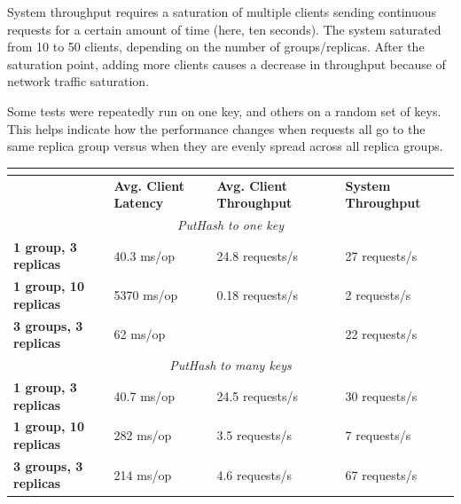 \documentclass[letterpaper,10pt]{article}
\begin{document}
System throughput requires a saturation of multiple clients sending continuous requests for a certain amount of time (here, ten seconds). The system saturated from 10 to 50 clients, depending on the number of groups/replicas. After the saturation point, adding more clients
causes a decrease in throughput because of network traffic saturation.

Some tests were repeatedly run on one key, and others on a random set of keys. This helps indicate how the performance changes when requests all go to the same replica group versus when they are evenly spread across all replica groups.

\begin{table}
\begin{tabular}{|l|l|l|l|}
\hline
\multicolumn{4}{|c|}{\cellcolor[HTML]{C0C0C0}{\color[HTML]{000000} \textbf{Vanilla Paxos}}}                           \\ \hline
                              & \textbf{Avg. Client Latency} & \textbf{Avg. Client Throughput} & \textbf{System Throughput} \\ \hline
\multicolumn{4}{|c|}{\textit{PutHash to one key}}                                                                     \\ \hline
\textbf{1 group, 3 replicas}  & 40.3 ms/op                   & 24.8 requests/s              & 27 requests/s           \\ \hline
\textbf{1 group, 10 replicas} & 5370 ms/op                   & 0.18 requests/s              & 2 requests/s            \\ \hline
\textbf{3 groups, 3 replicas} & 62 ms/op                     &                              & 22 requests/s           \\ \hline
\multicolumn{4}{|c|}{\textit{PutHash to many keys}}                                                                   \\ \hline
\textbf{1 group, 3 replicas}  & 40.7 ms/op                   & 24.5 requests/s              & 30 requests/s           \\ \hline
\textbf{1 group, 10 replicas} & 282 ms/op                    & 3.5 requests/s               & 7 requests/s            \\ \hline
\textbf{3 groups, 3 replicas} & 214 ms/op                    & 4.6 requests/s               & 67 requests/s           \\ \hline
\end{tabular}
\end{table}
\end{document}
